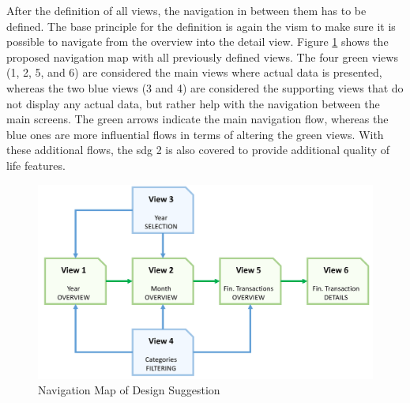 After the definition of all views, the navigation in between them has to be defined. The base principle for the definition is again the \gls{vism} to make sure it is possible to navigate from the overview into the detail view. Figure \ref{fig:navigationmap} shows the proposed navigation map with all previously defined views. The four green views (1, 2, 5, and 6) are considered the main views where actual data is presented, whereas the two blue views (3 and 4) are considered the supporting views that do not display any actual data, but rather help with the navigation between the main screens. The green arrows indicate the main navigation flow, whereas the blue ones are more influential flows in terms of  altering the green views. With these additional flows, the \gls{sdg} 2 is also covered to provide additional quality of life features. \newline
\begin{figure}[t]
	\begin{center}
		\includegraphics[width=14cm]{03_Figures/07_Suggestion/NavigationMap.png}
		\caption{Navigation Map of Design Suggestion}
		\label{fig:navigationmap}
	\end{center}
\end{figure}

